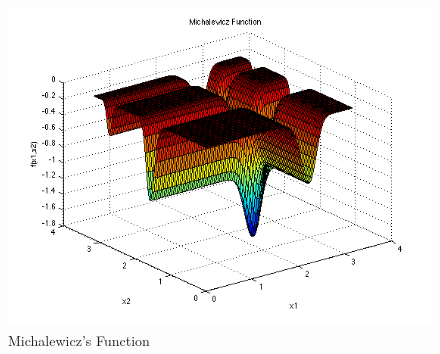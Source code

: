 \documentclass{article}
\begin{document}
\begin{figure}[!h]
  \centering
  \includegraphics[width=\textwidth,height=\textheight,keepaspectratio]{michal.png}
  \caption{Michalewicz's Function\cite{michal_img}}
\end{figure}
\end{document}
